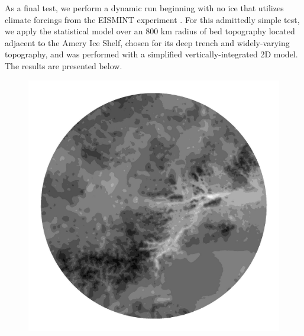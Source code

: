 As a final test, we perform a dynamic run beginning with no ice that utilizes climate forcings from the EISMINT experiment \citep{payne_2000}.  For this admittedly simple test, we apply the statistical model over an 800 km radius of bed topography located adjacent to the Amery Ice Shelf, chosen for its deep trench and widely-varying topography, and was performed with a simplified vertically-integrated 2D model.  The results are presented below.

\begin{figure}
  \centering
  
  \begin{minipage}[b]{0.30\linewidth}
    \includegraphics[width=1.0\textwidth]{images/EISMINT_II/vars/B.jpg}
  \end{minipage}
  \quad
  \begin{minipage}[b]{0.30\linewidth}

\end{minipage}
\end{figure}
